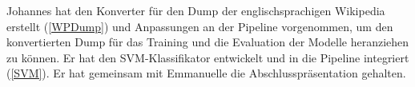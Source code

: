 Johannes hat den Konverter für den Dump der englischsprachigen Wikipedia erstellt (\ref{WPDump}) und Anpassungen an der Pipeline vorgenommen, um den konvertierten Dump für das Training und die Evaluation der Modelle heranziehen zu können. Er hat den SVM-Klassifikator entwickelt und in die Pipeline integriert (\ref{SVM}). Er hat gemeinsam mit Emmanuelle die Abschlusspräsentation gehalten.